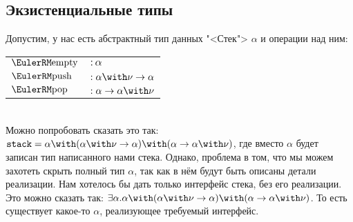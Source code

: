 \subsection*{\texorpdfstring{Экзистенциальные типы}{Existential types}}

\todo
Допустим, у нас есть абстрактный тип данных "<Стек"> $\alpha$ и операции над ним: \\
\begin{tabular}{l l}
    $\func{empty}$ & $: \alpha$ \\
    $\func{push}$  & $: \alpha\with\nu\to\alpha$ \\
    $\func{pop}$   & $: \alpha\to\alpha\with\nu$ \\
\end{tabular} \\
Можно попробовать сказать это так: $\mathtt{stack} =
    \alpha \with (\alpha\with\nu\to\alpha) \with (\alpha\to\alpha\with\nu)$, где вместо $\alpha$ будет записан тип написанного нами стека.
Однако, проблема в том, что мы можем захотеть скрыть полный тип $\alpha$, так как в нём будут быть описаны детали реализации.
Нам хотелось бы дать только интерфейс стека, без его реализации. Это можно сказать так:
    $\exists \alpha . \alpha \with (\alpha\with\nu\to\alpha) \with (\alpha\to\alpha\with\nu)$.
То есть существует какое-то $\alpha$, реализующее требуемый интерфейс.

